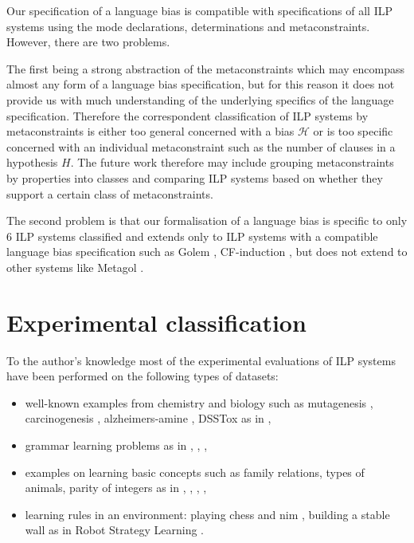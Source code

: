 Our specification of a language bias is compatible with specifications of all ILP systems using the mode declarations, determinations and metaconstraints. However, there are two problems.

The first being a strong abstraction of the metaconstraints which may encompass almost any form of a language bias specification, but for this reason it does not provide us with much understanding of the underlying specifics of the language specification. Therefore the correspondent classification of ILP systems by metaconstraints is either too general concerned with a bias $\mathcal{H}$ or is too specific concerned with an individual metaconstraint such as the number of clauses in a hypothesis $H$. The future work therefore may include grouping metaconstraints by properties into classes and comparing ILP systems based on whether they support a certain class of metaconstraints.

The second problem is that our formalisation of a language bias is specific to only 6 ILP systems classified and extends only to ILP systems with a compatible language bias specification such as Golem \cite{muggleton1992efficient}, CF-induction \cite{yamamoto2014cfInductionWebsite}, but does not extend to other systems like Metagol \cite{muggleton2013meta}\cite{muggleton2014meta}.

\section{Experimental classification}\label{evaluation_experimental_classification}
To the author's knowledge most of the experimental evaluations of ILP systems have been performed on the following types of datasets:
\begin{itemize}
\item well-known examples from chemistry and biology such as mutagenesis \cite{srinivasan1994mutagenesis}, carcinogenesis \cite{srinivasan1997carcinogenesis}, alzheimers-amine \cite{king1995relating}, DSSTox \cite{richard2002distributed} as in \cite{muggleton2008toplog}\cite{corapi2011nonmonotonic},
\item grammar learning problems as in \cite{muggleton1999progolWebsite} \cite{muggleton2012mc}, \cite{muggleton2013meta}, \cite{kimber2012learning},
\item examples on learning basic concepts such as family relations, types of animals, parity of integers as in \cite{muggleton1999progolWebsite}, \cite{santos2008toplogWebsite}, \cite{corapi2011tal}, \cite{aleph2007},
\item learning rules in an environment: playing chess and nim \cite{muggleton1999progolWebsite}, building a stable wall as in Robot Strategy Learning \cite{muggleton2014meta}.
\end{itemize}

